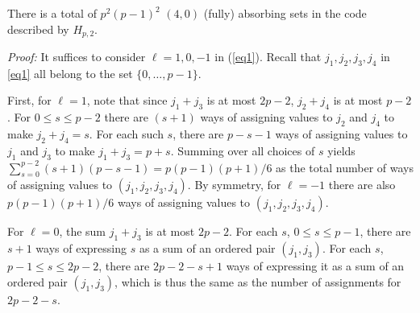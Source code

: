 


\begin{lemma}\label{lemma40} There is a total of $p^2(p-1)^2$ $(4,0)$ (fully) absorbing sets in
the code described by $H_{p,2}$.
\end{lemma}
\noindent \textit{Proof:} It suffices to consider $\ell=1,0,-1$ in
(\ref{eq1}). Recall that $j_1,j_2,j_3,j_4$ in \eqref{eq1} all
belong to the set $\{0,\dots,p-1\}$.

First, for $\ell=1$, note that since $j_1+j_3$ is at most $2p-2$,
 $j_2+j_4$ is at most $p-2$. For $0 \leq s \leq p-2$ there are
$(s+1)$ ways of assigning values to $j_2$ and $j_4$ to make
$j_2+j_4=s$. For each such $s$, there are $p-s-1$ ways of
assigning values to $j_1$ and $j_3$ to make $j_1+j_3=p+s$. Summing
over all choices of $s$ yields $\sum_{s=0}^{p-2}
(s+1)(p-s-1)=p(p-1)(p+1)/6$ as the total number of ways of
assigning values to $(j_1,j_2,j_3,j_4)$. By symmetry, for
$\ell=-1$ there are also $p(p-1)(p+1)/6$ ways of assigning values
to $(j_1,j_2,j_3,j_4)$.

For $\ell=0$, the sum $j_1+j_3$ is at most $2p-2$. For each $s$,
$0 \leq s \leq p-1$, there are $s+1$ ways of expressing $s$ as a
sum of an ordered pair $(j_1,j_3)$. For each $s$, $p-1 \leq s \leq
2p-2$, there are $2p-2-s+1$ ways of expressing it as a sum of an
ordered pair $(j_1,j_3)$, which is thus the same as the number of
assignments for $2p-2-s$.

